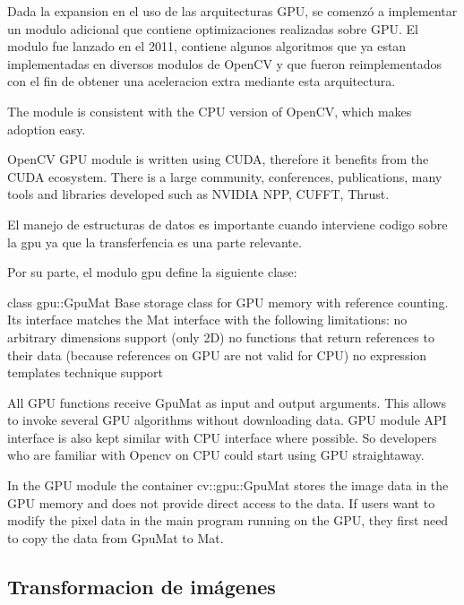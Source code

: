 \documentclass[a4paper,10pt]{report}
\begin{document}

Dada la expansion en el uso de las arquitecturas GPU, se comenzó a implementar un modulo adicional que contiene optimizaciones realizadas sobre GPU.
El modulo fue lanzado en el 2011, contiene algunos algoritmos que ya estan implementadas en diversos modulos de OpenCV y que fueron reimplementados con el fin de obtener una aceleracion extra mediante esta arquitectura.

The module is consistent with the CPU version of OpenCV, which makes adoption easy. 

OpenCV GPU module is written using CUDA, therefore it benefits from the CUDA ecosystem. There is a large community, conferences, publications, many tools and libraries developed such as NVIDIA NPP, CUFFT, Thrust.


El manejo de estructuras de datos es importante cuando interviene codigo sobre la gpu ya que la transferfencia es una parte relevante. 

Por su parte, el modulo gpu define la siguiente clase:

class gpu::GpuMat
Base storage class for GPU memory with reference counting. Its interface matches the Mat interface with the following limitations:
no arbitrary dimensions support (only 2D)
no functions that return references to their data (because references on GPU are not valid for CPU)
no expression templates technique support

All GPU functions receive GpuMat as input and output arguments. This allows to invoke several GPU algorithms without downloading data. GPU module API interface is also kept similar with CPU interface where possible. So developers who are familiar with Opencv on CPU could start using GPU straightaway.


In the GPU module the container cv::gpu::GpuMat stores the image data in the GPU memory and does not provide direct access to the data. If users want to modify the pixel data in the main program running on the GPU, they first need to copy the data from GpuMat to Mat.





\subsection{Transformacion de imágenes}
\end{document}
